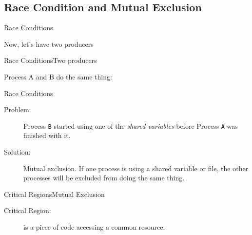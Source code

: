 \subsection{Race Condition and Mutual Exclusion}
\label{sec:race-condition}

\begin{frame}{Race Conditions}
  \begin{block}{Now, let's have two producers}
    \begin{center}
    \end{center}
  \end{block}
\end{frame}

\begin{frame}{Race Conditions}{Two producers}
  \begin{center}
  \end{center}
  \begin{block}{Process A and B do the same thing:}
    \begin{center}
    \end{center}
  \end{block}
\end{frame}

\begin{frame}{Race Conditions}
  \begin{description}
  \item[Problem:] Process \texttt{B} started using one of the \emph{shared variables} before
    Process \texttt{A} was finished with it.
  \item[Solution:] \alert{Mutual exclusion}. If one process is using a shared variable or
    file, the other processes will be excluded from doing the same thing.
  \end{description}
\end{frame}

\begin{frame}{Critical Regions}{Mutual Exclusion}
  \begin{description}
  \item[Critical Region:] is a piece of code accessing a common resource.
  \end{description}
  \begin{center}
  \end{center}
\end{frame}

